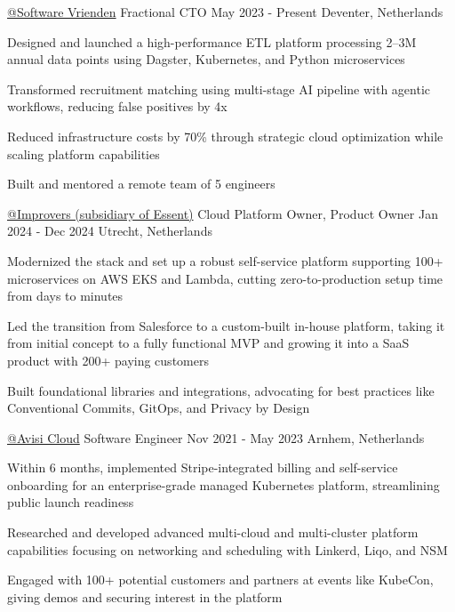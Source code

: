 
\begin{cventries}
  \cventry
    {\href{https://softwarevrienden.nl}{@Software Vrienden}}
    {Fractional CTO}
    {May 2023 - Present}
    {Deventer, Netherlands}
    {
      \begin{cvitems}
        \item {Designed and launched a high-performance ETL platform processing 2--3M annual data points using Dagster, Kubernetes, and Python microservices}
        \item {Transformed recruitment matching using multi-stage AI pipeline with agentic workflows, reducing false positives by 4x}
        \item {Reduced infrastructure costs by 70\% through strategic cloud optimization while scaling platform capabilities}
        \item {Built and mentored a remote team of 5 engineers}
      \end{cvitems}
    }

  \cventry
    {\href{https://improvers.nl}{@Improvers (subsidiary of Essent)}}
    {Cloud Platform Owner, Product Owner}
    {Jan 2024 - Dec 2024}
    {Utrecht, Netherlands}
    {
      \begin{cvitems}
        \item {Modernized the stack and set up a robust self-service platform supporting 100+ microservices on AWS EKS and Lambda, cutting zero-to-production setup time from days to minutes}
        \item {Led the transition from Salesforce to a custom-built in-house platform, taking it from initial concept to a fully functional MVP and growing it into a SaaS product with 200+ paying customers}
        \item {Built foundational libraries and integrations, advocating for best practices like Conventional Commits, GitOps, and Privacy by Design}
      \end{cvitems}
    }

  \cventry
    {\href{https://avisi.cloud}{@Avisi Cloud}}
    {Software Engineer}
    {Nov 2021 - May 2023}
    {Arnhem, Netherlands}
    {
      \begin{cvitems}
        \item {Within 6 months, implemented Stripe-integrated billing and self-service onboarding for an enterprise-grade managed Kubernetes platform, streamlining public launch readiness}
        \item {Researched and developed advanced multi-cloud and multi-cluster platform capabilities focusing on networking and scheduling with Linkerd, Liqo, and NSM}
        \item {Engaged with 100+ potential customers and partners at events like KubeCon, giving demos and securing interest in the platform}
      \end{cvitems}
    }


\end{cventries}
